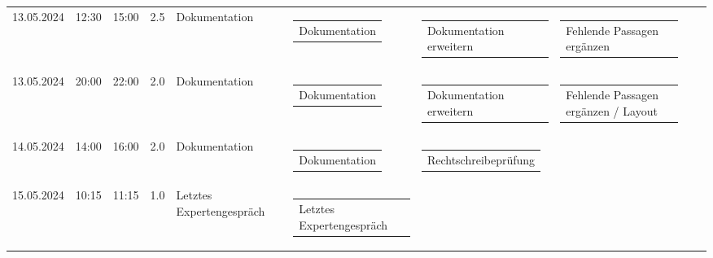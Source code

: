 {\begin{longtable}[H]{lllrllllll}
13.05.2024 & 12:30 & 15:00 & 2.5 & Dokumentation & \begin{tabular}[c]{@{}l@{}}Dokumentation\end{tabular} & \begin{tabular}[c]{@{}l@{}}Dokumentation erweitern\end{tabular} & \begin{tabular}[c]{@{}l@{}}Fehlende Passagen ergänzen\end{tabular} & \begin{tabular}[c]{@{}l@{}}\end{tabular} & \begin{tabular}[c]{@{}l@{}}\end{tabular} \\
13.05.2024 & 20:00 & 22:00 & 2.0 & Dokumentation & \begin{tabular}[c]{@{}l@{}}Dokumentation\end{tabular} & \begin{tabular}[c]{@{}l@{}}Dokumentation erweitern\end{tabular} & \begin{tabular}[c]{@{}l@{}}Fehlende Passagen ergänzen / Layout\end{tabular} & \begin{tabular}[c]{@{}l@{}}\end{tabular} & \begin{tabular}[c]{@{}l@{}}\end{tabular} \\
14.05.2024 & 14:00 & 16:00 & 2.0 & Dokumentation & \begin{tabular}[c]{@{}l@{}}Dokumentation\end{tabular} & \begin{tabular}[c]{@{}l@{}}Rechtschreibeprüfung\end{tabular} & \begin{tabular}[c]{@{}l@{}}\end{tabular} & \begin{tabular}[c]{@{}l@{}}\end{tabular} & \begin{tabular}[c]{@{}l@{}}\end{tabular} \\
15.05.2024 & 10:15 & 11:15 & 1.0 & Letztes Expertengespräch & \begin{tabular}[c]{@{}l@{}}Letztes Expertengespräch\end{tabular} & \begin{tabular}[c]{@{}l@{}}\end{tabular} & \begin{tabular}[c]{@{}l@{}}\end{tabular} & \begin{tabular}[c]{@{}l@{}}\end{tabular} & \begin{tabular}[c]{@{}l@{}}\end{tabular} \\

\end{longtable}}
